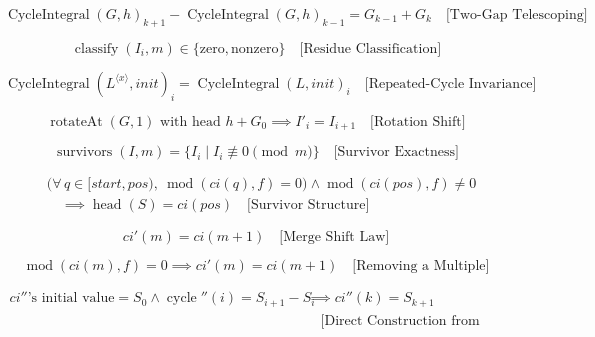\begin{equation*}
\operatorname{CycleIntegral}(G,h)_{k+1}
- \operatorname{CycleIntegral}(G,h)_{k-1}
= G_{k-1} + G_k
\quad \text{[Two-Gap Telescoping]}
\end{equation*}

\begin{equation*}
\operatorname{classify}(I_i,m)
\in \{\text{zero},\text{nonzero}\}
\quad \text{[Residue Classification]}
\end{equation*}

\begin{equation*}
\operatorname{CycleIntegral}(L^{\langle x\rangle}, init)_i
= \operatorname{CycleIntegral}(L, init)_i
\quad \text{[Repeated-Cycle Invariance]}
\end{equation*}

\begin{equation*}
\operatorname{rotateAt}(G,1)\text{ with head }h+G_0
\implies
I'_{i}=I_{i+1}
\quad \text{[Rotation Shift]}
\end{equation*}

\begin{equation*}
\operatorname{survivors}(I,m)
= \{ I_i \mid I_i \not\equiv 0 \pmod m \}
\quad \text{[Survivor Exactness]}
\end{equation*}

\begin{equation*}
\begin{aligned}
&\big(\forall\, q \in [start,pos),\ \operatorname{mod}(ci(q),f)=0\big) \land \operatorname{mod}(ci(pos),f)\neq 0 \\
&\quad \implies
\operatorname{head}(S) = ci(pos)
\quad \text{[Survivor Structure]}
\end{aligned}
\end{equation*}

\begin{equation*}
ci'(m) = ci(m + 1)
\quad \text{[Merge Shift Law]}
\end{equation*}

\begin{equation*}
\operatorname{mod}(ci(m), f) = 0 \implies ci'(m) = ci(m + 1)
\quad \text{[Removing a Multiple]}
\end{equation*}

\begin{equation*}
\begin{aligned}
ci''\text{'s initial value} = S_0 \land \operatorname{cycle}''(i) = S_{i+1} - S_i
&\implies ci''(k) = S_{k+1} \\
&\quad \text{[Direct Construction from Survivors]}
\end{aligned}
\end{equation*}

